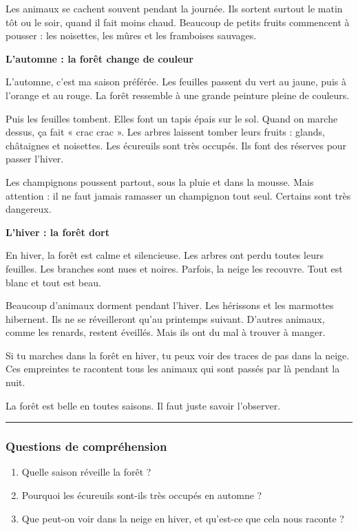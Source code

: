 \documentclass[
  french,
  14pt,
  a4paper,
]{extarticle}
\providecommand{\tightlist}{%
  \setlength{\itemsep}{0pt}\setlength{\parskip}{0pt}}
\begin{document}
Les animaux se cachent souvent pendant la journée. Ils sortent surtout
le matin tôt ou le soir, quand il fait moins chaud. Beaucoup de petits
fruits commencent à pousser : les noisettes, les mûres et les framboises
sauvages.

\textbf{L'automne : la forêt change de couleur}

L'automne, c'est ma saison préférée. Les feuilles passent du vert au
jaune, puis à l'orange et au rouge. La forêt ressemble à une grande
peinture pleine de couleurs.

Puis les feuilles tombent. Elles font un tapis épais sur le sol. Quand
on marche dessus, ça fait « crac crac ». Les arbres laissent tomber
leurs fruits : glands, châtaignes et noisettes. Les écureuils sont très
occupés. Ils font des réserves pour passer l'hiver.

Les champignons poussent partout, sous la pluie et dans la mousse. Mais
attention : il ne faut jamais ramasser un champignon tout seul. Certains
sont très dangereux.

\textbf{L'hiver : la forêt dort}

En hiver, la forêt est calme et silencieuse. Les arbres ont perdu toutes
leurs feuilles. Les branches sont nues et noires. Parfois, la neige les
recouvre. Tout est blanc et tout est beau.

Beaucoup d'animaux dorment pendant l'hiver. Les hérissons et les
marmottes hibernent. Ils ne se réveilleront qu'au printemps suivant.
D'autres animaux, comme les renards, restent éveillés. Mais ils ont du
mal à trouver à manger.

Si tu marches dans la forêt en hiver, tu peux voir des traces de pas
dans la neige. Ces empreintes te racontent tous les animaux qui sont
passés par là pendant la nuit.

La forêt est belle en toutes saisons. Il faut juste savoir l'observer.

\begin{center}\rule{0.5\linewidth}{0.5pt}\end{center}

\subsubsection{Questions de
compréhension}\label{questions-de-compruxe9hension-14}

\begin{enumerate}
\def\labelenumi{\arabic{enumi}.}
\tightlist
\item
  Quelle saison réveille la forêt ?
\item
  Pourquoi les écureuils sont-ils très occupés en automne ?
\item
  Que peut-on voir dans la neige en hiver, et qu'est-ce que cela nous
  raconte ?
\end{enumerate}
\end{document}
